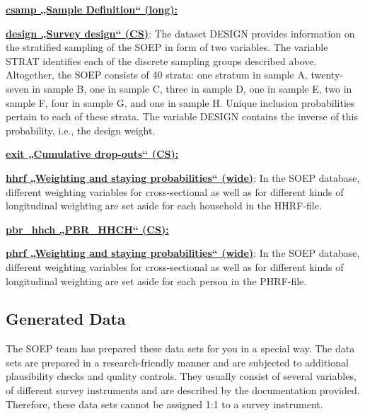\documentclass[letterpaper,10pt,openany,onesideH,english]{sphinxmanual}
\begin{document}
 \href{https://paneldata.org/soep-long/data/csamp}{\textbf{csamp „Sample Definition“ (long):}}

 \href{https://paneldata.org/soep-core/data/design}{\textbf{design „Survey design“ (CS)}}: The dataset DESIGN provides information on the stratified sampling of the SOEP in form of two variables. The variable STRAT identifies each of the discrete sampling groups described above. Altogether, the SOEP consists of 40 strata: one stratum in sample A, twenty-seven in sample B, one in sample C, three in sample D, one in sample E, two in sample F, four in sample G, and one in sample H. Unique inclusion probabilities pertain to each of these strata. The variable DESIGN contains the inverse of this probability, i.e., the design weight.

 \href{https://paneldata.org/soep-core/data/exit}{\textbf{exit „Cumulative drop-outs“ (CS):}}

 \href{https://paneldata.org/soep-core/data/hhrf}{\textbf{hhrf „Weighting and staying probabilities“ (wide)}}: In the SOEP database, different weighting variables for cross-sectional as well as for different kinds of longitudinal weighting are set aside for each household in the HHRF-file.

 \href{https://paneldata.org/soep-core/data/pbr_hhch}{\textbf{pbr\_hhch „PBR\_HHCH“ (CS):}}

 \href{https://paneldata.org/soep-core/data/phrf}{\textbf{phrf „Weighting and staying probabilities“ (wide)}}: In the SOEP database, different weighting variables for cross-sectional as well as for different kinds of longitudinal weighting are set aside for each person in the PHRF-file.


\subsection{Generated Data}
\label{\detokenize{Principles of Data Structure/index:generated-data}}
The SOEP team has prepared these data sets for you in a special way. The data sets are prepared in a research-friendly manner and are subjected to additional plausibility checks and quality controls. They usually consist of several variables, of different survey instruments and are described by the documentation provided. Therefore, these data sets cannot be assigned 1:1 to a survey instrument.
\end{document}
